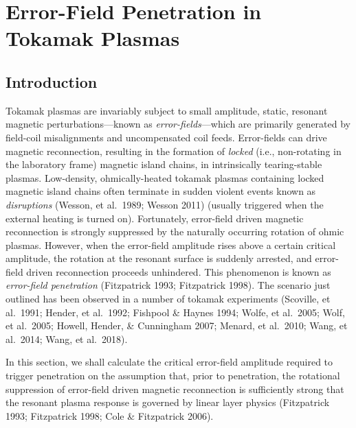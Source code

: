 \documentclass[notitlepage,12pt]{article}
\begin{document}
\section{Error-Field Penetration in Tokamak Plasmas}
\subsection{Introduction}
Tokamak plasmas are invariably subject to small amplitude, static, resonant magnetic pert\-urbations---known as
{\em error-fields}---which are primarily generated by field-coil misalignments and uncompensated coil feeds. 
Error-fields can drive magnetic reconnection, resulting in the formation of {\em locked}\/ (i.e., non-rotating in the laboratory
frame) magnetic island chains, in intrinsically tearing-stable plasmas. Low-density, ohmically-heated tokamak plasmas
containing locked magnetic island chains often terminate in sudden violent events known as {\em disruptions}\/ (Wesson, et al.\ 1989; Wesson 2011) (usually triggered when the
external heating is turned on). Fortunately, error-field driven magnetic reconnection is strongly
suppressed by the naturally occurring rotation of ohmic plasmas. However, when the error-field amplitude rises
above a certain critical amplitude, the rotation at the resonant surface is suddenly arrested, and error-field driven reconnection proceeds
unhindered. This phenomenon is known as {\em error-field penetration}\/ (Fitzpatrick 1993; Fitzpatrick 1998). The scenario
just outlined has been observed in a number of tokamak experiments (Scoville, et al.\ 1991; Hender, et al.\ 1992; Fishpool
\& Haynes 1994; Wolfe, et al.\ 2005; Wolf, et al.\ 2005; Howell, Hender, \& Cunningham 2007; Menard, et al.\ 2010; Wang, et al.\ 2014; Wang, et al.\ 2018).

In this section, we shall calculate the critical error-field amplitude required to trigger penetration on the assumption that,
prior to penetration, the rotational suppression of error-field driven magnetic reconnection is sufficiently strong that
the resonant plasma response is governed by linear layer physics (Fitzpatrick 1993; Fitzpatrick 1998; Cole \& Fitzpatrick 2006).
\end{document}
